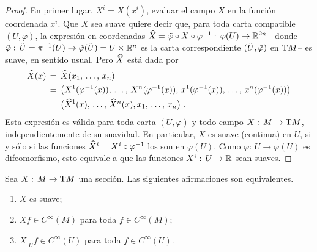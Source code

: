 \begin{proof}
	En primer lugar, $X^i=X(x^i)$, evaluar el campo $X$ en la funci\'{o}n
	coordenada $x^i$. Que $X$ sea suave quiere decir que, para toda carta
	compatible $(U,\varphi)$, la expresi\'{o}n en coordenadas
	\begin{math}
		\widehat{X}=
			\tilde{\varphi}\circ X\circ\varphi^{-1}:\,
			\varphi(U)\rightarrow\mathbb{R}^{2n}
	\end{math} --donde
	\begin{math}
		\tilde{\varphi}:\,\tilde{U}=\pi^{-1}(U)\rightarrow
			\tilde{\varphi}(\tilde{U})=U\times\mathbb{R}^{n}
	\end{math} es la carta correspondiente
	$(\tilde{U},\tilde{\varphi})$ en $\tangente{M}$-- es suave,
	en sentido usual. Pero $\widehat{X}$ est\'{a} dada por
	\begin{align*}
		\encoordenadas{X}(x) & \,=\,\encoordenadas{X}(\lista{x}{n}) \\
		& \,=\,
			\big(X^1(\varphi^{-1}(x)),\,\dots,\,
				X^n(\varphi^{-1}(x)),\,
				x^1(\varphi^{-1}(x)),\,\dots,\,
				x^n(\varphi^{-1}(x))\big) \\
		& \,=\,\big(\encoordenadas{X}^1(x),\,\dots,\,
			\encoordenadas{X}^n(x),\lista{x}{n}\big)
		\text{ .}
	\end{align*}
	Esta expresi\'{o}n es v\'{a}lida para toda carta $(U,\varphi)$ y todo
	campo $X:\,M\rightarrow\tangente{M}$, independientemente de su
	suavidad. En particular, $X$ es suave (continua) en $U$, si y s\'{o}lo
	si las funciones $\widehat{X}^i=X^i\circ\varphi^{-1}$ los son en
	$\varphi(U)$. Como $\varphi:\,U\rightarrow\varphi(U)$ es difeomorfismo,
	esto equivale a que las funciones $X^i:\,U\rightarrow\mathbb{R}$ sean
	suaves.
\end{proof}

\begin{propoEquivalenciaSuavidadCampos}\label{propo:equivalenciasuavidadcampos}
	Sea $X:\,M\rightarrow\tangente{M}$ una secci\'{o}n. Las siguientes
	afirmaciones son equivalentes.
	\begin{enumerate}
		\item\label{propo:equivalenciasuavidadcampos:seccion}
			$X$ es suave;
		\item\label{propo:equivalenciasuavidadcampos:global}
			$Xf\in C^\infty(M)$ para toda $f\in C^\infty(M)$;
		\item\label{propo:equivalenciasuavidadcampos:entornos}
			$X|_Uf\in C^\infty(U)$ para toda $f\in C^\infty(U)$.
	\end{enumerate}
\end{propoEquivalenciaSuavidadCampos}

